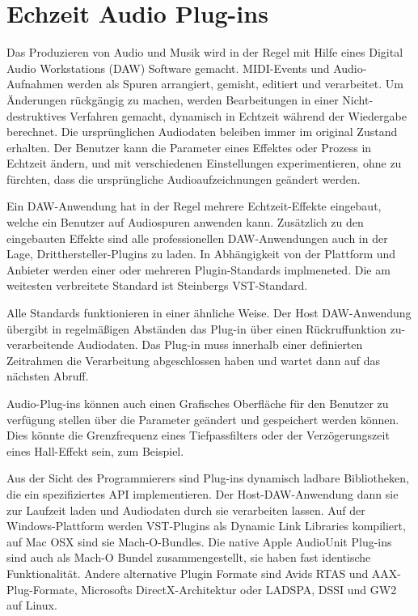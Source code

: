 \section{Echzeit Audio Plug-ins}

Das Produzieren von Audio und Musik wird in der Regel mit Hilfe eines Digital Audio Workstations (DAW) Software gemacht. MIDI-Events und Audio-Aufnahmen werden als Spuren arrangiert, gemisht, editiert und verarbeitet. Um Änderungen rückgängig zu machen, werden Bearbeitungen in einer Nicht-destruktives Verfahren gemacht, dynamisch in Echtzeit während der Wiedergabe berechnet. Die ursprünglichen Audiodaten beleiben immer im original Zustand erhalten. Der Benutzer kann die Parameter eines Effektes oder Prozess in Echtzeit ändern, und mit verschiedenen Einstellungen experimentieren, ohne zu fürchten, dass die ursprüngliche Audioaufzeichnungen geändert werden.

Ein DAW-Anwendung hat in der Regel mehrere Echtzeit-Effekte eingebaut, welche ein Benutzer auf Audiospuren anwenden kann. Zusätzlich zu den eingebauten Effekte sind alle professionellen DAW-Anwendungen auch in der Lage, Dritthersteller-Plugins zu laden. In Abhängigkeit von der Plattform und Anbieter werden einer oder mehreren Plugin-Standards implmeneted. Die am weitesten verbreitete Standard ist Steinbergs VST-Standard.

Alle Standards funktionieren in einer ähnliche Weise. Der Host DAW-Anwendung übergibt in regelmäßigen Abständen das Plug-in über einen Rückruffunktion zu-verarbeitende Audiodaten. Das Plug-in muss innerhalb einer definierten Zeitrahmen die Verarbeitung abgeschlossen haben und wartet dann auf das nächsten Abruff.

Audio-Plug-ins können auch einen Grafisches Oberfläche für den Benutzer zu verfügung stellen über die Parameter geändert und gespeichert werden können. Dies könnte die Grenzfrequenz eines Tiefpassfilters oder der Verzögerungszeit eines Hall-Effekt sein, zum Beispiel.

Aus der Sicht des Programmierers sind Plug-ins dynamisch ladbare Bibliotheken, die ein spezifiziertes API implementieren. Der Host-DAW-Anwendung dann sie zur Laufzeit laden und Audiodaten durch sie verarbeiten lassen\cite{realtime-architectures}. Auf der Windows-Plattform werden VST-Plugins als Dynamic Link Libraries kompiliert, auf Mac OSX sind sie Mach-O-Bundles. Die native Apple AudioUnit Plug-ins sind auch als Mach-O Bundel zusammengestellt, sie haben fast identische Funktionalität. Andere alternative Plugin Formate sind Avids RTAS und AAX-Plug-Formate, Microsofts DirectX-Architektur oder LADSPA, DSSI und GW2 auf Linux.

